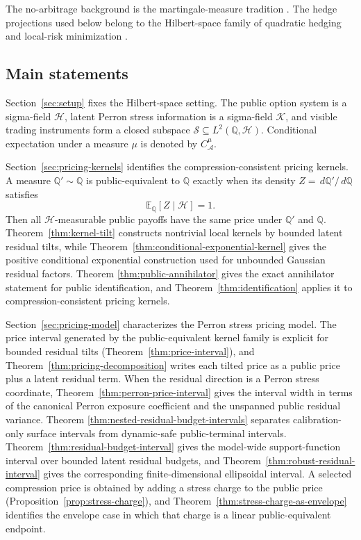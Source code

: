 \documentclass[11pt,a4paper]{amsart}
\theoremstyle{plain}
\theoremstyle{definition}
\theoremstyle{remark}
\newcommand{\QQ}{\mathbb{Q}}
\newcommand{\EE}{\mathbb{E}}
\newcommand{\cA}{\mathcal{A}}
\newcommand{\cH}{\mathcal{H}}
\newcommand{\cK}{\mathcal{K}}
\newcommand{\cS}{\mathcal{S}}
\newcommand{\dd}{\,d}
\begin{document}
The no-arbitrage background is the martingale-measure tradition
\cite{harrisonKreps1979,harrisonPliska1981,delbaen1994,karatzasShreve1998}.  The hedge projections
used below belong to the Hilbert-space family of quadratic hedging and local-risk minimization
\cite{follmerSondermann1986,follmerSchweizer1991,schweizer1992meanVariance,schweizer1995minimal}.

\subsection*{Main statements}

Section~\ref{sec:setup} fixes the Hilbert-space setting.  The public option system is a
sigma-field \(\cH\), latent Perron stress information is a sigma-field \(\cK\), and visible trading
instruments form a closed subspace \(\cS\subseteq L^2(\QQ,\cH)\).  Conditional expectation under a
measure \(\mu\) is denoted by \(C_{\cA}^{\mu}\).

Section~\ref{sec:pricing-kernels} identifies the compression-consistent pricing kernels.  A
measure \(\QQ'\sim\QQ\) is public-equivalent to \(\QQ\) exactly when its density
\(Z=\dd\QQ'/\dd\QQ\) satisfies
\[
        \EE_\QQ[Z\mid \cH]=1.
\]
Then all \(\cH\)-measurable public payoffs have the same price under \(\QQ'\) and \(\QQ\).
Theorem~\ref{thm:kernel-tilt} constructs nontrivial local kernels by bounded latent residual
tilts, while Theorem~\ref{thm:conditional-exponential-kernel} gives the positive conditional
exponential construction used for unbounded Gaussian residual factors.  Theorem
\ref{thm:public-annihilator} gives the exact annihilator statement for public identification, and
Theorem~\ref{thm:identification} applies it to compression-consistent pricing kernels.

Section~\ref{sec:pricing-model} characterizes the Perron stress pricing model.  The price interval
generated by the public-equivalent kernel family is explicit for bounded residual tilts
(Theorem~\ref{thm:price-interval}), and Theorem~\ref{thm:pricing-decomposition} writes each tilted
price as a public price plus a latent residual term.  When the residual direction is a Perron
stress coordinate, Theorem~\ref{thm:perron-price-interval} gives the interval width in terms of the
canonical Perron exposure coefficient and the unspanned public residual variance.  Theorem
\ref{thm:nested-residual-budget-intervals} separates calibration-only surface intervals from
dynamic-safe public-terminal intervals.  Theorem~\ref{thm:residual-budget-interval} gives the
model-wide support-function interval over bounded latent residual budgets, and
Theorem~\ref{thm:robust-residual-interval} gives the corresponding finite-dimensional ellipsoidal
interval.  A selected compression price is obtained by adding a stress charge to the public price
(Proposition~\ref{prop:stress-charge}), and Theorem~\ref{thm:stress-charge-as-envelope} identifies
the envelope case in which that charge is a linear public-equivalent endpoint.
\end{document}
